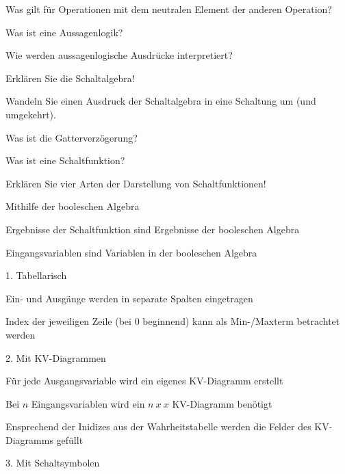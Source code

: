 \documentclass
[
  draft    = true,
  fontsize = 11pt,
  parskip  = half-,
  BCOR     = 0pt,
  DIV      = 11,
  ngerman,
  dvipsnames
]
{scrartcl}
\begin{document}
\begin{mytemize}
  \item Was gilt für Operationen mit dem neutralen Element der anderen Operation?
  \item Was ist eine Aussagenlogik?
  \item Wie werden aussagenlogische Ausdrücke interpretiert?
  \item Erklären Sie die Schaltalgebra!
  \item Wandeln Sie einen Ausdruck der Schaltalgebra in eine Schaltung um (und umgekehrt).
  \item Was ist die Gatterverzögerung?
  \item Was ist eine Schaltfunktion?
  \item Erklären Sie vier Arten der Darstellung von Schaltfunktionen!
        \begin{karsten}
          \begin{mytemize}
              \item Mithilfe der booleschen Algebra
                \begin{mytemize}
                  \item Ergebnisse der Schaltfunktion sind Ergebnisse der booleschen Algebra
                  \item Eingangsvariablen sind Variablen in der booleschen Algebra
                \end{mytemize}	
              \item 1. Tabellarisch
                \begin{mytemize}
                  \item Ein- und Ausgänge werden in separate Spalten eingetragen
                  \item Index der jeweiligen Zeile (bei 0 beginnend) kann als Min-/Maxterm betrachtet werden
                \end{mytemize}	
              \item 2. Mit KV-Diagrammen
                \begin{mytemize}
                  \item Für jede Ausgangsvariable wird ein eigenes KV-Diagramm erstellt
                  \item Bei $n$ Eingangsvariablen wird ein $n\ x\ x$ KV-Diagramm benötigt
                  \item Ensprechend der Inidizes aus der Wahrheitstabelle werden die Felder des KV-Diagramms gefüllt 
                \end{mytemize}
              \item 3. Mit Schaltsymbolen

\end{mytemize}
\end{karsten}
\end{mytemize}
\end{document}
